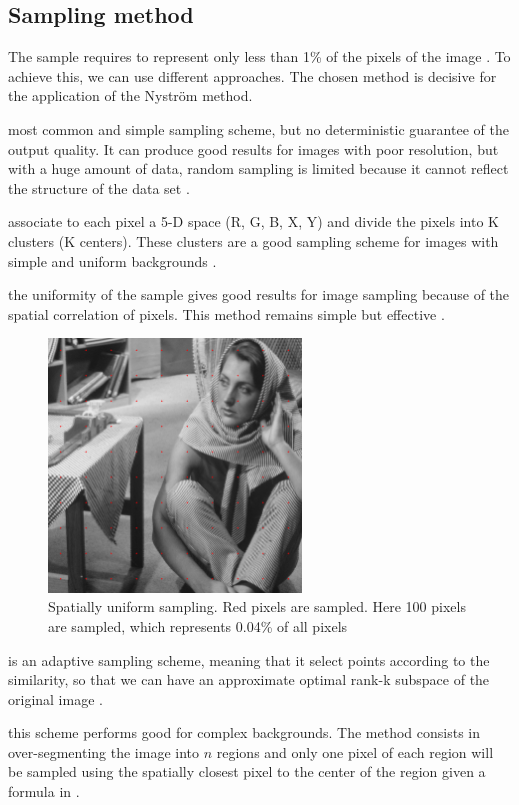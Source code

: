\subsection{Sampling method}
\label{subsec:sampling-variations}
The sample requires to represent only less than 1\% of the pixels of the image \cite{glide_2014}.
To achieve this, we can use different approaches. The chosen method is decisive for the application of the Nystr\"om method.
\begin{description}[align=left]
 \item [Random sampling (RS)] most common and simple sampling scheme, but no deterministic guarantee of the output quality. It can produce good results for images with poor resolution, but with a huge amount of data, random sampling is limited because it cannot reflect the structure of the data set \cite{zhan_improved_2017}.
 \item [K-means sampling (KS)] associate to each pixel a 5-D space (R, G, B, X, Y) and divide the pixels into K clusters (K centers). These clusters are a good sampling scheme for images with simple and uniform backgrounds \cite{kao_sampling_2012} \cite{zhang_improved_2008}.
 \item [Uniform spatially sampling] the uniformity of the sample gives good results for image sampling because of the spatial correlation of pixels. This method remains simple but effective \cite{glide_2014}.
  \begin{figure}[H]
      \centering
      \includegraphics[width=0.6\textwidth]{img/spatiallyUniformSampling.png}
      \caption{Spatially uniform sampling. Red pixels are sampled. Here 100 pixels are sampled, which represents 0.04\% of all pixels}
  \end{figure}
 \item [Incremental sampling (INS)] is an adaptive sampling scheme, meaning that it select points according to the similarity, so that we can have an approximate optimal rank-k subspace of the original image \cite{zhan_improved_2017}.
 \item [Mean-shift segmentation-based sampling] this scheme performs good for complex backgrounds. The method consists in over-segmenting the image into \(n\) regions and only one pixel of each region will be sampled using the spatially closest pixel to the center of the region given a formula in \cite{kao_sampling_2012}.
\end{description}

